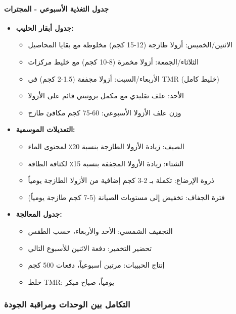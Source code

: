 \paragraph{جدول التغذية الأسبوعي - المجترات}
\begin{itemize}
    \item \textbf{جدول أبقار الحليب:}
    \begin{itemize}
        \item الاثنين/الخميس: أزولا طازجة (12-15 كجم) مخلوطة مع بقايا المحاصيل
        \item الثلاثاء/الجمعة: أزولا مخمرة (8-10 كجم) مع خليط مركزات
        \item الأربعاء/السبت: أزولا مجففة (1.5-2 كجم) في TMR (خليط كامل)
        \item الأحد: علف تقليدي مع مكمل بروتيني قائم على الأزولا
        \item وزن علف الأزولا الأسبوعي: 60-75 كجم مكافئ طازج
    \end{itemize}
    \item \textbf{التعديلات الموسمية:}
    \begin{itemize}
        \item الصيف: زيادة الأزولا الطازجة بنسبة 20٪ لمحتوى الماء
        \item الشتاء: زيادة الأزولا المجففة بنسبة 15٪ لكثافة الطاقة
        \item ذروة الإرضاع: تكملة بـ 2-3 كجم إضافية من الأزولا الطازجة يومياً
        \item فترة الجفاف: تخفيض إلى مستويات الصيانة (5-7 كجم طازجة يومياً)
    \end{itemize}
    \item \textbf{جدول المعالجة:}
    \begin{itemize}
        \item التجفيف الشمسي: الأحد والأربعاء، حسب الطقس
        \item تحضير التخمير: دفعة الاثنين للأسبوع التالي
        \item إنتاج الحبيبات: مرتين أسبوعياً، دفعات 500 كجم
        \item خلط TMR: يومياً، صباح مبكر
    \end{itemize}
\end{itemize}

\subsubsection{التكامل بين الوحدات ومراقبة الجودة}
\label{sec:feed_integration}

